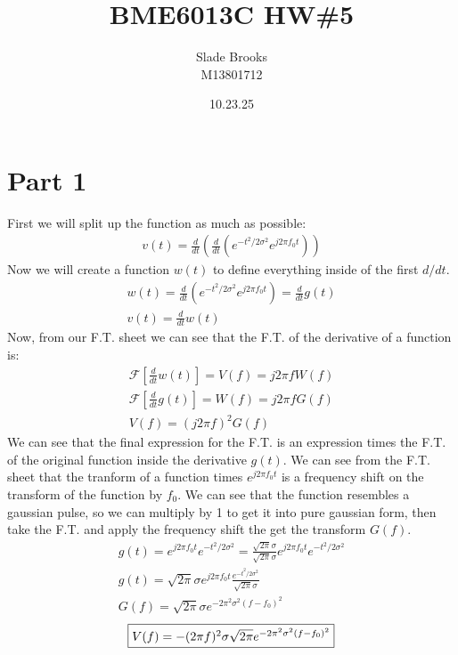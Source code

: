 \documentclass[12 pt]{article}
\title{BME6013C HW\#5}
\date{10.23.25}
\author{Slade Brooks \\ M13801712}
\begin{document}
\maketitle

\section*{Part 1}
First we will split up the function as much as possible:
\begin{align*}
    v(t)=\frac{d}{d t}\left(\frac{d}{d t}\left(e^{-t^2/2\sigma^2}e^{j2\pi f_0t}\right)\right)
\end{align*}
Now we will create a function $w(t)$ to define everything inside of the first $d/dt$.
\begin{align*}
    w(t)=\frac{d}{d t}\left(e^{-t^2/2\sigma^2}e^{j2\pi f_0t}\right)=\frac{d}{dt}g(t) \\
    v(t) = \frac{d}{dt}w(t)
\end{align*}
Now, from our F.T. sheet we can see that the F.T. of the derivative of a function is:
\begin{align*}
    \mathcal{F}\left[\frac{d}{dt}w(t)\right]=V(f)=j2\pi fW(f) \\
    \mathcal{F}\left[\frac{d}{dt}g(t)\right]=W(f)=j2\pi fG(f) \\
    V(f)=(j2\pi f)^2G(f)
\end{align*}
We can see that the final expression for the F.T. is an expression times the F.T. of the original function inside the
derivative $g(t)$. We can see from the F.T. sheet that the tranform of a function times $e^{j2\pi f_0t}$ is a frequency
shift on the transform of the function by $f_0$. We can see that the function resembles a gaussian pulse, so we can
multiply by 1 to get it into pure gaussian form, then take the F.T. and apply the frequency shift the get the transform
$G(f)$.
\begin{align*}
    g(t) = e^{j2\pi f_0t}e^{-t^2/2\sigma^2} = \frac{\sqrt{2\pi}\sigma}{\sqrt{2\pi}\sigma}e^{j2\pi f_0t}e^{-t^2/2\sigma^2} \\
    g(t) = \sqrt{2\pi}\sigma e^{j2\pi f_0t} \frac{e^{-t^2/2\sigma^2}}{\sqrt{2\pi}\sigma} \\
    G(f) = \sqrt{2\pi}\sigma e^{-2\pi^2\sigma^2(f-f_0)^2}
\end{align*}
\begin{align*}
    \fbox{$V(f)=-(2\pi f)^2\sigma\sqrt{2\pi} e^{-2\pi^2\sigma^2(f-f_0)^2}$}
\end{align*}
\end{document}
